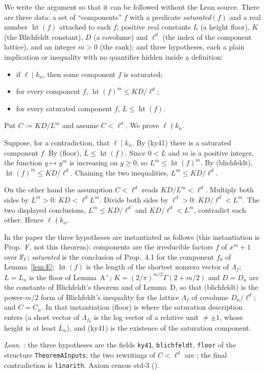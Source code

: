 We write the argument so that it can be followed without the Lean source. There are three data: a set of ``components'' $f$ with a predicate \emph{saturated}$(f)$ and a real number $\operatorname{ht}(f)$ attached to each $f$; positive real constants $L$ (a height floor), $K$ (the Blichfeldt constant), $D$ (a covolume) and $\ell^d$ (the index of the component lattice), and an integer $m>0$ (the rank); and three hypotheses, each a plain implication or inequality with no quantifier hidden inside a definition:
\begin{itemize}
\item[(ky41)] if $\ell\mid k_n$, then some component $f$ is saturated;
\item[(blichfeldt)] for every component $f$, $\operatorname{ht}(f)^m\le KD/\ell^d$;
\item[(floor)] for every saturated component $f$, $L\le\operatorname{ht}(f)$.
\end{itemize}
Put $C:=KD/L^m$ and assume $C<\ell^d$. We prove $\ell\nmid k_n$.

Suppose, for a contradiction, that $\ell\mid k_n$. By (ky41) there is a saturated component $f$. By (floor), $L\le\operatorname{ht}(f)$. Since $0<L$ and $m$ is a positive integer, the function $y\mapsto y^m$ is increasing on $y\ge0$, so $L^m\le\operatorname{ht}(f)^m$. By (blichfeldt), $\operatorname{ht}(f)^m\le KD/\ell^d$. Chaining the two inequalities, $L^m\le KD/\ell^d$.

On the other hand the assumption $C<\ell^d$ reads $KD/L^m<\ell^d$. Multiply both sides by $L^m>0$: $KD<\ell^dL^m$. Divide both sides by $\ell^d>0$: $KD/\ell^d<L^m$. The two displayed conclusions, $L^m\le KD/\ell^d$ and $KD/\ell^d<L^m$, contradict each other. Hence $\ell\nmid k_n$.

In the paper the three hypotheses are instantiated as follows (this instantiation is Prop.~F, not this theorem): components are the irreducible factors $f$ of $x^m+1$ over $\mathbb{F}_\ell$; \emph{saturated} is the conclusion of \cite{KY} Prop.~4.1 for the component $f_0$ of Lemma~\ref{lem:E}; $\operatorname{ht}(f)$ is the length of the shortest nonzero vector of $\Lambda_f$; $L=L_n$ is the floor of Lemma~A$^+$; $K=(2/\pi)^{m/2}\Gamma(2+m/2)$ and $D=D_n$ are the constants of Blichfeldt's theorem and of Lemma~D, so that (blichfeldt) is the power-$m/2$ form of Blichfeldt's inequality for the lattice $\Lambda_f$ of covolume $D_n/\ell^{d}$; and $C=C_n$. In that instantiation (floor) is where the saturation description enters (a short vector of $\Lambda_{f_0}$ is the log vector of a relative unit $\ne\pm1$, whose height is at least $L_n$), and (ky41) is the existence of the saturation component.

\emph{Lean.} : the three hypotheses are the fields \texttt{ky41}, \texttt{blichfeldt}, \texttt{floor} of the structure \texttt{TheoremAInputs}; the two rewritings of $C<\ell^d$ are ; the final contradiction is \texttt{linarith}. Axiom census std-3 ().
